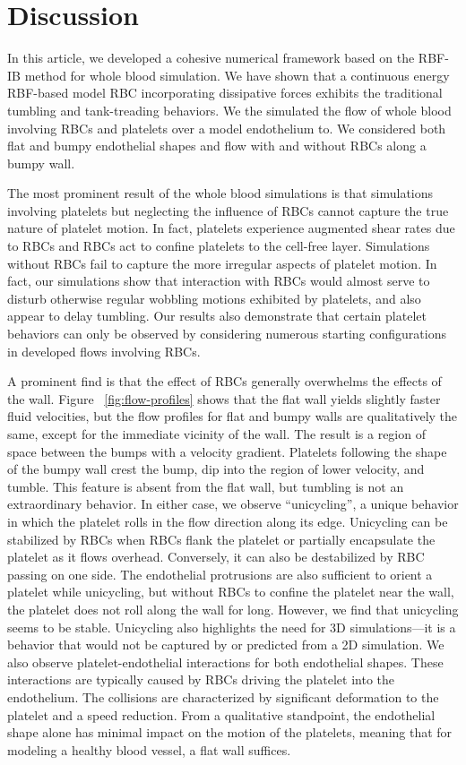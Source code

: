 \section{Discussion}\label{sec:conclusion}

In this article, we developed a cohesive numerical framework based on the RBF-IB method
for whole blood simulation. We have shown that a
continuous energy RBF-based model RBC incorporating dissipative forces exhibits the traditional
tumbling and tank-treading behaviors. We the simulated the flow of whole
blood involving RBCs and platelets over a model endothelium to. We considered both flat
and bumpy endothelial shapes and flow with and without RBCs along a bumpy wall.

The most prominent result of the whole blood simulations is that simulations
involving platelets but neglecting the influence of RBCs cannot capture the true nature of platelet motion.
In fact, platelets experience augmented shear rates due to RBCs and RBCs act to confine platelets to the
cell-free layer. Simulations without RBCs fail to capture the more irregular aspects
of platelet motion. In fact, our simulations show that interaction with RBCs would almost
serve to disturb otherwise regular wobbling motions exhibited by platelets, and also appear to delay tumbling. Our results
also demonstrate that certain platelet behaviors can only be observed by considering
numerous starting configurations in developed flows involving RBCs.

A prominent find is that the effect of RBCs generally overwhelms the effects of the wall. Figure~%
\ref{fig:flow-profiles} shows that the flat wall yields slightly faster fluid velocities,
but the flow profiles for flat and bumpy walls are qualitatively the same, except for the
immediate vicinity of the wall. The result is a region of space between the bumps with a
velocity gradient. Platelets following the shape of the bumpy wall crest the bump, dip
into the region of lower velocity, and tumble. This feature is absent from the flat wall,
but tumbling is not an extraordinary behavior. In either case, we observe ``unicycling'', a unique behavior in
which the platelet rolls in the flow direction along its edge. Unicycling can be
stabilized by RBCs when RBCs flank the platelet or partially encapsulate the
platelet as it flows overhead. Conversely, it can also be destabilized by RBC passing on one side.
The endothelial protrusions are also sufficient to orient a platelet while unicycling,
but without RBCs to confine the platelet near the wall, the platelet does not roll along
the wall for long. However, we find that unicycling seems to be stable. Unicycling also
highlights the need for 3D simulations---it is a behavior that would not be
captured by or predicted from a 2D simulation. We also observe platelet-endothelial interactions
for both endothelial shapes. These interactions are typically caused by RBCs driving the
platelet into the endothelium. The collisions are characterized by significant
deformation to the platelet and a speed reduction. From a qualitative standpoint, the
endothelial shape alone has minimal impact on the motion of the platelets, meaning that
for modeling a healthy blood vessel, a flat wall suffices.

